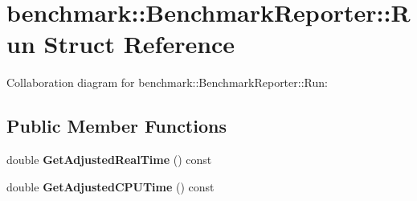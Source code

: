 \hypertarget{structbenchmark_1_1_benchmark_reporter_1_1_run}{}\section{benchmark\+:\+:Benchmark\+Reporter\+:\+:Run Struct Reference}
\label{structbenchmark_1_1_benchmark_reporter_1_1_run}


Collaboration diagram for benchmark\+:\+:Benchmark\+Reporter\+:\+:Run\+:
\subsection*{Public Member Functions}
\begin{DoxyCompactItemize}
\item 
\mbox{\label{structbenchmark_1_1_benchmark_reporter_1_1_run_a0977a18a0657e5751827d2a1bb7baa23}} 
double {\bfseries Get\+Adjusted\+Real\+Time} () const
\item 
\mbox{\label{structbenchmark_1_1_benchmark_reporter_1_1_run_a667177d5c68dda14228b6548da4a5da0}} 
double {\bfseries Get\+Adjusted\+C\+P\+U\+Time} () const
\end{DoxyCompactItemize}
